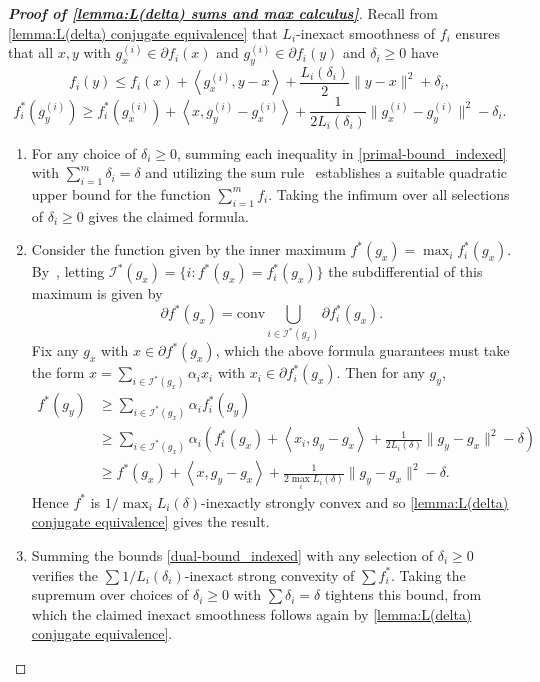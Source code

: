 \documentclass[11pt, hidelinks]{article}
\numberwithin{equation}{section}
\theoremstyle{thmstyletwo}%
\numberwithin{equation}{section}
\newcommand{\inner}[2]{\left\langle {#1}, {#2} \right\rangle}
\begin{document}
\begin{proof}[\bf Proof of \cref{lemma:L(delta) sums and max calculus}]
    Recall from \cref{lemma:L(delta) conjugate equivalence} that $L_i$-inexact smoothness of $f_i$ ensures that all $x, y$ with $g_x^{(i)} \in \partial f_i(x)$ and $g_y^{(i)}\in \partial f_i(y)$ and $\delta_i \geq 0$ have
    \begin{equation}\label{primal-bound_indexed}f_i(y) \leq f_i(x) + \inner{g_x^{(i)}}{y-x}+\frac{L_i(\delta_i)}{2}\|y-x\|^2 + \delta_i,\end{equation}
    \begin{equation}\label{dual-bound_indexed}f_i^*(g_y^{(i)}) \geq f_i^*(g_x^{(i)}) + \inner{x}{g_y^{(i)}-g_x^{(i)}}+\frac{1}{2L_i(\delta_i)}\|g_x^{(i)}-g_y^{(i)}\|^2 - \delta_i .\end{equation}
    \begin{enumerate}
        \item For any choice of $\delta_i\geq 0$, summing each inequality in \eqref{primal-bound_indexed} with $\sum_{i=1}^m {\delta_i}=\delta$ and utilizing the sum rule~\cite[Theorem 23.8]{rockafeller}
        establishes a suitable quadratic upper bound for the function $\sum_{i=1}^m f_i$. Taking the infimum over all selections of $\delta_i\geq 0$ gives the claimed formula.
        \item Consider the function given by the inner maximum $f^*(g_x) = \max_{i} f_i^*(g_x)$. By~\cite[Theorem 18.5]{bauschke}, letting $\mathcal{I}^*(g_x) = \{i : f^*(g_x) = f_i^*(g_x)\}$ the subdifferential of this maximum is given by $$\partial f^*(g_x) = {\mathrm{conv}} \bigcup_{i \in \mathcal{I}^*(g_x)} \partial f_i^*(g_x) .$$
        Fix any $g_x$ with $x \in \partial f^*(g_x)$, which the above formula guarantees must take the form $x = \sum_{i \in \mathcal{I}^*(g_x)} \alpha_ix_i$ with $x_i \in \partial f_i^*(g_x)$. Then for any $g_y$, \begin{align*}
            f^*(g_y) &\geq \sum_{i \in \mathcal{I}^*(g_x)} \alpha_i f_i^*(g_y)\\
            &\geq \sum_{i \in \mathcal{I}^*(g_x)} \alpha_i(f_i^*(g_x) + \inner{x_i}{g_y-g_x}+\frac{1}{ 2L_i(\delta)}\|g_y-g_x\|^2 -\delta)\\
            &\geq f^*(g_x) + \inner{x}{g_y-g_x}+\frac{1}{2\max_i L_i(\delta)}\|g_y-g_x\|^2 -\delta .
        \end{align*}
        Hence $f^*$ is $1/\max_i L_i(\delta)$-inexactly strongly convex and so \cref{lemma:L(delta) conjugate equivalence} gives the result.
        \item Summing the bounds \eqref{dual-bound_indexed} with any selection of $\delta_i\geq 0$ verifies the $\sum 1/L_i(\delta_i)$-inexact strong convexity of $\sum f_i^*$. Taking the supremum over choices of $\delta_i\geq 0$ with $\sum \delta_i = \delta$ tightens this bound, from which the claimed inexact smoothness follows again by \cref{lemma:L(delta) conjugate equivalence}.


\end{enumerate}
\end{proof}
\end{document}
